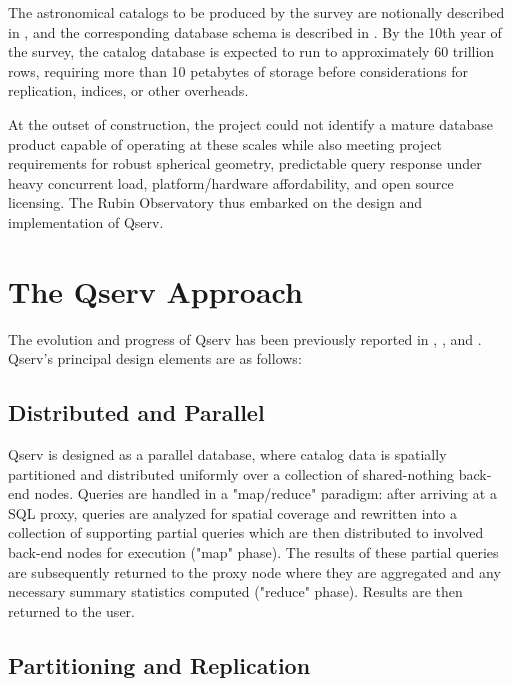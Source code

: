 \documentclass[11pt,twoside]{article}
\begin{document}
The astronomical catalogs to be produced by the survey are notionally described in \citet{LSE-163}, and the
corresponding database schema is described in \citet{LDM-153}.  By the 10th year of the survey, the catalog
database is expected to run to approximately 60 trillion rows, requiring more than 10 petabytes of storage
before considerations for replication, indices, or other overheads.

At the outset of construction, the project could not identify a mature database product capable of operating
at these scales while also meeting project requirements for robust spherical geometry, predictable query
response under heavy concurrent load, platform/hardware affordability, and open source licensing.  The Rubin
Observatory thus embarked on the design and implementation of Qserv.

\section{The Qserv Approach}

The evolution and progress of Qserv has been previously reported in \citet{2006SPIE.6270E..0RB},
\citet{2011Wang:2011:QDS:2063348.2063364}, and \citet{LDM-135}.  Qserv's principal design elements are as
follows:

\subsection{Distributed and Parallel}

Qserv is designed as a parallel database, where catalog data is spatially partitioned and distributed
uniformly over a collection of shared-nothing back-end nodes.  Queries are handled in a "map/reduce" paradigm:
after arriving at a SQL proxy, queries are analyzed for spatial coverage and rewritten into a collection of
supporting partial queries which are then distributed to involved back-end nodes for execution ("map" phase).
The results of these partial queries are subsequently returned to the proxy node where they are aggregated and
any necessary summary statistics computed ("reduce" phase). Results are then returned to the user.

\subsection{Partitioning and Replication}
\end{document}
